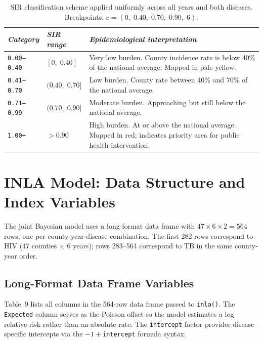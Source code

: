 \documentclass[11pt,a4paper]{article}
\newcommand{\code}[1]{\texttt{\small #1}}
\begin{document}
\begin{table}[H]
\caption{SIR classification scheme applied uniformly across all years and both diseases. Breakpoints: $c=(0,\;0.40,\;0.70,\;0.90,\;6)$.}
\renewcommand{\arraystretch}{1.10}
\scriptsize\begin{tabularx}{\textwidth}{@{}L{2.8cm}L{2.8cm}X@{}}
\toprule
\textit{Category} & \textit{SIR range} & \textit{Epidemiological interpretation}\\
\midrule
\code{0.00--0.40} & $[0,\;0.40]$    & Very low burden. County incidence rate is below 40\% of the national average. Mapped in pale yellow.\\
\code{0.41--0.70} & $(0.40,\;0.70]$ & Low burden. County rate between 40\% and 70\% of the national average.\\
\code{0.71--0.99} & $(0.70,\;0.90]$ & Moderate burden. Approaching but still below the national average.\\
\code{1.00+}      & $>0.90$         & High burden. At or above the national average. Mapped in red; indicates priority area for public health intervention.\\
\bottomrule
\end{tabularx}
\renewcommand{\arraystretch}{1.10}
\end{table}

\section{INLA Model: Data Structure and Index Variables}

The joint Bayesian model uses a long-format data frame with
$47\times6\times2 = 564$ rows, one per county-year-disease combination.
The first 282 rows correspond to HIV (47 counties $\times$ 6 years);
rows 283--564 correspond to TB in the same county-year order.

\subsection{Long-Format Data Frame Variables}

Table~9 lists all columns in the 564-row data frame passed to \code{inla()}.
The \code{Expected} column serves as the Poisson offset so the model estimates
a log relative risk rather than an absolute rate. The \code{intercept} factor
provides disease-specific intercepts via the \code{$-1+$intercept} formula syntax.
\end{document}
